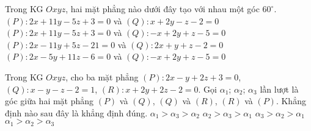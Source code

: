 \begin{ex}%
	Trong KG $Oxyz$, hai mặt phẳng nào dưới đây tạo với nhau một góc $60^\circ$.
	\choice
	{$(P)\colon 2x+11y-5z+3=0$ và $(Q)\colon x+2y-z-2=0$}
	{\True $(P)\colon 2x+11y-5z+3=0$ và $(Q)\colon-x+2y+z-5=0$}
	{$(P)\colon 2x-11y+5z-21=0$ và $(Q)\colon 2x+y+z-2=0$}
	{$(P)\colon 2x-5y+11z-6=0$ và $(Q)\colon -x+2y+z-5=0$}
\end{ex}
\begin{ex}%
	Trong KG $Oxyz$, cho ba mặt phẳng $(P)\colon 2x-y+2z+3=0$, $(Q)\colon x-y-z-2=1$, $(R)\colon x+2y+2z-2=0$. Gọi $\alpha _1$; $\alpha _2$; $\alpha _3$ lần lượt là góc giữa hai mặt phẳng $(P)$ và $(Q)$, $(Q)$ và $(R)$, $(R)$ và $(P)$. Khẳng định nào sau đây là khẳng định đúng.
	\choice
	{\True $\alpha _1>\alpha _3>\alpha _2$}
	{$\alpha _2>\alpha _3>\alpha _1$}
	{$\alpha _3>\alpha _2>\alpha _1$}
	{$\alpha _1>\alpha _2>\alpha _3$}
\end{ex}
